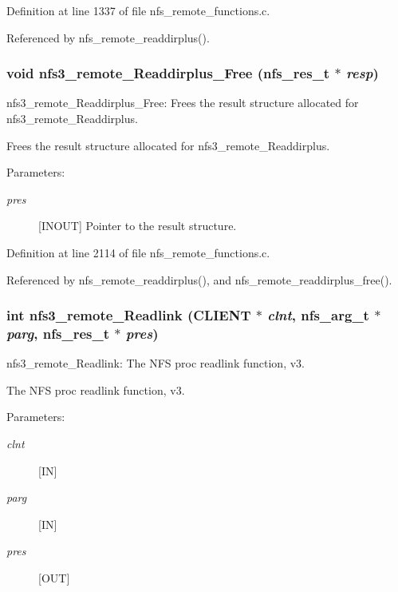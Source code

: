 Definition at line 1337 of file nfs\_\-remote\_\-functions.c.

Referenced by nfs\_\-remote\_\-readdirplus().
\subsubsection{\setlength{\rightskip}{0pt plus 5cm}void nfs3\_\-remote\_\-Readdirplus\_\-Free (nfs\_\-res\_\-t $\ast$ {\em resp})}\label{group__NFSprocs_ga88}


nfs3\_\-remote\_\-Readdirplus\_\-Free: Frees the result structure allocated for nfs3\_\-remote\_\-Readdirplus.

Frees the result structure allocated for nfs3\_\-remote\_\-Readdirplus.

\begin{Desc}
\item[Parameters:]
\begin{description}
\item[{\em pres}][INOUT] Pointer to the result structure. \end{description}
\end{Desc}


Definition at line 2114 of file nfs\_\-remote\_\-functions.c.

Referenced by nfs\_\-remote\_\-readdirplus(), and nfs\_\-remote\_\-readdirplus\_\-free().
\subsubsection{\setlength{\rightskip}{0pt plus 5cm}int nfs3\_\-remote\_\-Readlink (CLIENT $\ast$ {\em clnt}, nfs\_\-arg\_\-t $\ast$ {\em parg}, nfs\_\-res\_\-t $\ast$ {\em pres})}\label{group__NFSprocs_ga22}


nfs3\_\-remote\_\-Readlink: The NFS proc readlink function, v3.

The NFS proc readlink function, v3.

\begin{Desc}
\item[Parameters:]
\begin{description}
\item[{\em clnt}][IN] \item[{\em parg}][IN] \item[{\em pres}][OUT] \end{description}
\end{Desc}


